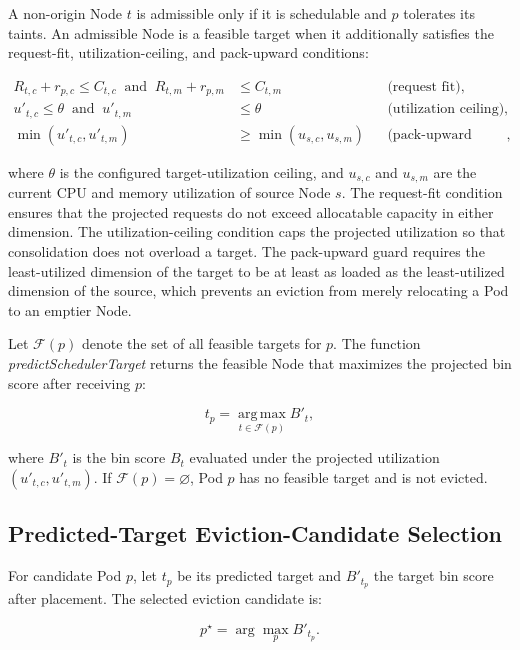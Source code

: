 A non-origin Node \(t\) is admissible only if it is schedulable and \(p\) tolerates its taints. An admissible Node is a feasible target when it additionally satisfies the request-fit, utilization-ceiling, and pack-upward conditions:

\[
\begin{aligned}
    R_{t,c} + r_{p,c} \leq C_{t,c} \;\;\text{and}\;\; R_{t,m} + r_{p,m} &\leq C_{t,m} && \text{(request fit)}, \\
    u'_{t,c} \leq \theta \;\;\text{and}\;\; u'_{t,m} &\leq \theta && \text{(utilization ceiling)}, \\
    \min\!\left(u'_{t,c}, u'_{t,m}\right) &\geq \min\!\left(u_{s,c}, u_{s,m}\right) && \text{(pack-upward guard)},
\end{aligned}
\]

where \(\theta\) is the configured target-utilization ceiling, and \(u_{s,c}\) and \(u_{s,m}\) are the current CPU and memory utilization of source Node \(s\). The request-fit condition ensures that the projected requests do not exceed allocatable capacity in either dimension. The utilization-ceiling condition caps the projected utilization so that consolidation does not overload a target. The pack-upward guard requires the least-utilized dimension of the target to be at least as loaded as the least-utilized dimension of the source, which prevents an eviction from merely relocating a Pod to an emptier Node.

Let \(\mathcal{F}(p)\) denote the set of all feasible targets for \(p\). The function \textit{predictSchedulerTarget} returns the feasible Node that maximizes the projected bin score after receiving \(p\):

\[
    t_p = \operatorname*{arg\,max}_{t \in \mathcal{F}(p)} B'_t,
\]

where \(B'_t\) is the bin score \(B_t\) evaluated under the projected utilization \(\left(u'_{t,c}, u'_{t,m}\right)\). If \(\mathcal{F}(p) = \varnothing\), Pod \(p\) has no feasible target and is not evicted.

\subsection{Predicted-Target Eviction-Candidate Selection}
\label{sec:defrag_victim_selection}

For candidate Pod \(p\), let \(t_p\) be its predicted target and \(B'_{t_p}\) the target bin score after placement. The selected eviction candidate is:

\[
    p^\star = \arg\max_{p} B'_{t_p}.
\]

